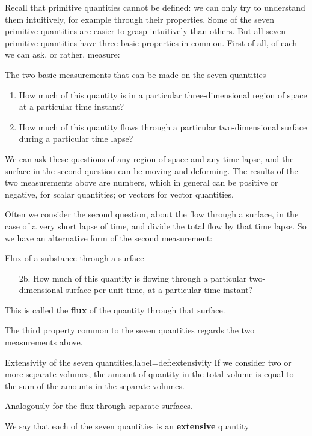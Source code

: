 \documentclass[a4paper,12pt,%
onecolumn,oneside,titlepage,%
british%
]{memoir}
\newcommand{\mynotew}[1]{{\footnotesize\color{midgrey}\faIcon{tools}\ #1}}
\renewcommand*{\|}[1][]{\nonscript\:#1\vert\nonscript\:\mathopen{}}
\begin{document}
\medskip

Recall that primitive quantities cannot be defined: we can only try to understand them intuitively, for example through their properties. Some of the seven primitive quantities are easier to grasp intuitively than others. But all seven primitive quantities have three basic properties in common. First of all, of each we can ask, or rather, measure:
\begin{definition}{The two basic measurements that can be made on the seven quantities}
  \begin{enumerate}[shift,label=\arabic*.]\bfseries
  \item How much of this quantity is in a particular three-dimensional region of space at a particular time instant?
    
  \item How much of this quantity flows through a particular two-dimensional surface during a particular time lapse?
  \end{enumerate}
\end{definition}
We can ask these questions of any region of space and any time lapse, and the surface in the second question can be moving and deforming.
The results of the two measurements above are numbers, which in general can be positive or negative, for scalar quantities; or vectors for vector quantities.

Often we consider the second question, about the flow through a surface, in the case of a very short lapse of time, and divide the total flow by that time lapse. So we have an alternative form of the second measurement:
\begin{definition}{Flux of a substance through a surface}
  \begin{enumerate}[shift,label=\arabic*.]\bfseries
  \item[2b.] How much of this quantity is flowing through a particular two-dimensional surface per unit time, at a particular time instant?
  \end{enumerate}
\end{definition}
This is called the \textbf{flux} of the quantity through that surface.

The third  property common to the seven quantities regards the two measurements above.
\begin{definition}{Extensivity of the seven quantities,label={def:extensivity}}
  If we consider two or more separate volumes, the amount of quantity in the total volume is equal to the sum of the amounts in the separate volumes.

  Analogously for the flux through separate surfaces.
\end{definition}
We say that each of the seven quantities is an \textbf{extensive} quantity
\end{document}
